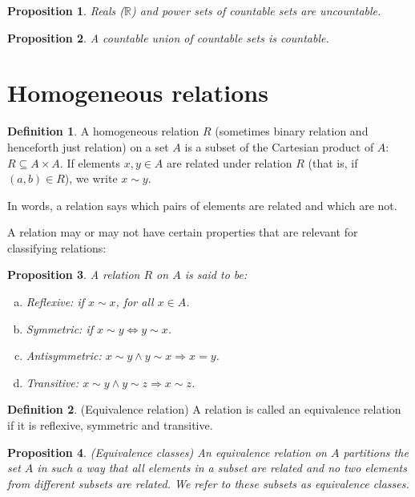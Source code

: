 \documentclass{book}
\theoremstyle{plain}%
\newtheorem{proposition}{Proposition}[section]
\theoremstyle{definition}
\newtheorem{definition}{Definition}[section]
\newlength{\arrow}
\begin{document}
\begin{appendices}
\begin{proposition} Reals ($\mathbb{R}$) and power sets of countable sets are uncountable.
\end{proposition}

\begin{proposition} A countable union of countable sets is countable.
\end{proposition}

\section{Homogeneous relations}

\begin{definition}
A homogeneous relation $R$ (sometimes binary relation and henceforth just relation) on a set $A$ is a subset of the Cartesian product of $A$: $R \subseteq A \times A$. If elements $x, y \in A$ are related under relation $R$ (that is, if $(a,b) \in R$), we write $x \sim y$.
\end{definition}

In words, a relation says which pairs of elements are related and which are not.

A relation may or may not have certain properties that are relevant for classifying relations:

\begin{proposition} A relation $R$ on $A$ is said to be:
\begin{enumerate}[(a)]
\item Reflexive: if $x \sim x$, for all $x \in A$.
\item Symmetric: if $x \sim y \Longleftrightarrow y \sim x$.
\item Antisymmetric: $x \sim y \wedge y \sim x\Longrightarrow x = y$.
\item Transitive: $x \sim y \wedge y \sim z\Longrightarrow x \sim z$.
\end{enumerate}
\end{proposition}
\end{appendices}

\begin{definition}(Equivalence relation)
A relation is called an equivalence relation if it is reflexive, symmetric and transitive.
\end{definition}

\begin{proposition}(Equivalence classes)
An equivalence relation on $A$ partitions the set $A$ in such a way that all elements in a subset are related and no two elements from different subsets are related. We refer to these subsets as equivalence classes.
\end{proposition}
\end{document}
